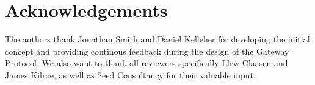 \section{Acknowledgements}
The authors thank Jonathan Smith and Daniel Kelleher for developing the initial concept and providing continous feedback during the design of the Gateway Protocol.
We also want to thank all reviewers specifically Llew Claasen and James Kilroe, as well as Seed Consultancy for their valuable input.